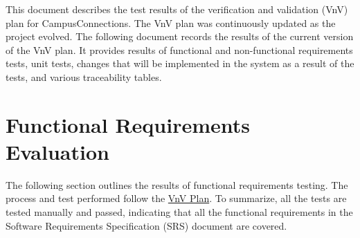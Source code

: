 \documentclass[12pt, titlepage]{article}
\begin{document}
This document describes the test results of the verification and validation (VnV) plan for CampusConnections. The VnV plan was continuously updated as the project evolved. The following document records the results of the current version of the VnV plan. It provides results of functional and non-functional requirements tests, unit tests, changes that will be implemented in the system as a result of the tests, and various traceability tables.


\section{Functional Requirements Evaluation}
The following section outlines the results of functional requirements testing. The process and test performed follow the \href{https://github.com/beatlepie/4G06CapstoneProjectTeam2/blob/main/docs/VnVPlan/VnVPlan.pdf}{VnV Plan}. To summarize, all the tests are tested manually and passed, indicating that all the functional requirements in the Software Requirements Specification (SRS) document are covered.
\end{document}
